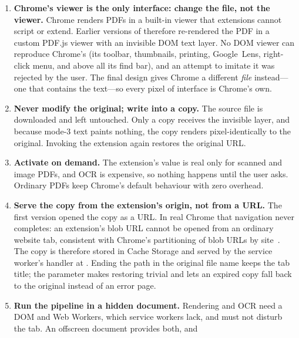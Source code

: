 \begin{enumerate}
  \item \textbf{Chrome's viewer is the only interface: change the file, not the
        viewer.} \label{dec:native}
        Chrome renders PDFs in a built-in viewer that extensions cannot script
        or extend. Earlier versions of \proj{} therefore re-rendered the PDF in
        a custom PDF.js viewer with an invisible DOM text layer. No DOM viewer
        can reproduce Chrome's (its toolbar, thumbnails, printing, Google~Lens,
        right-click menu, and above all its find bar), and an attempt to imitate
        it was rejected by the user. The final design gives Chrome a different
        \emph{file} instead---one that contains the text---so every pixel of
        interface is Chrome's own.
  \item \textbf{Never modify the original; write into a copy.} \label{dec:copy}
        The source file is downloaded and left untouched. Only a copy receives
        the invisible layer, and because mode-3 text paints nothing, the copy
        renders pixel-identically to the original. Invoking the extension again
        restores the original URL.
  \item \textbf{Activate on demand.} \label{dec:ondemand}
        The extension's value is real only for scanned and image PDFs, and OCR is
        expensive, so nothing happens until the user asks. Ordinary PDFs keep
        Chrome's default behaviour with zero overhead.
  \item \textbf{Serve the copy from the extension's origin, not from a
         URL.} \label{dec:serve}
        The first version opened the copy as a  URL. In real Chrome
        that navigation never completes: an extension's blob URL cannot be
        opened from an ordinary website tab, consistent with Chrome's
        partitioning of blob URLs by site~\cite{blobpartition}. The copy is
        therefore stored in Cache Storage and served by the service worker's
         handler at
        .
        Ending the path in the original file name keeps the tab title; the
         parameter makes restoring trivial and lets an expired copy
        fall back to the original instead of an error page.
  \item \textbf{Run the pipeline in a hidden document.} \label{dec:offscreen}
        Rendering and OCR need a DOM and Web Workers, which service workers lack,
        and must not disturb the tab. An offscreen document provides both, and

\end{enumerate}
